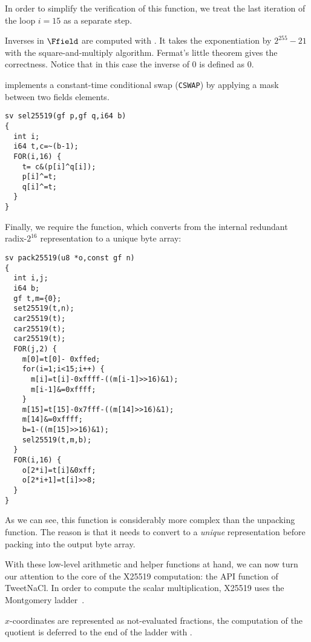In order to simplify the verification of this function,
we treat the last iteration of the loop $i = 15$ as a separate step.

Inverses in $\Ffield$ are computed with .
It takes the exponentiation by $2^{255}-21$ with the square-and-multiply algorithm.
Fermat's little theorem gives the correctness.
Notice that in this case the inverse of $0$ is defined as $0$.

 implements a constant-time conditional swap (\texttt{CSWAP}) by
applying a mask between two fields elements.
\begin{lstlisting}[language=Ctweetnacl]
sv sel25519(gf p,gf q,i64 b)
{
  int i;
  i64 t,c=~(b-1);
  FOR(i,16) {
    t= c&(p[i]^q[i]);
    p[i]^=t;
    q[i]^=t;
  }
}
\end{lstlisting}

Finally, we require the  function,
which converts from the internal redundant radix-$2^{16}$
representation to a unique byte array:
\begin{lstlisting}[language=Ctweetnacl]
sv pack25519(u8 *o,const gf n)
{
  int i,j;
  i64 b;
  gf t,m={0};
  set25519(t,n);
  car25519(t);
  car25519(t);
  car25519(t);
  FOR(j,2) {
    m[0]=t[0]- 0xffed;
    for(i=1;i<15;i++) {
      m[i]=t[i]-0xffff-((m[i-1]>>16)&1);
      m[i-1]&=0xffff;
    }
    m[15]=t[15]-0x7fff-((m[14]>>16)&1);
    m[14]&=0xffff;
    b=1-((m[15]>>16)&1);
    sel25519(t,m,b);
  }
  FOR(i,16) {
    o[2*i]=t[i]&0xff;
    o[2*i+1]=t[i]>>8;
  }
}
\end{lstlisting}
As we can see, this function is considerably more complex than the
unpacking function. The reason is that it needs to convert
to a \emph{unique} representation before packing into the output
byte array.

With these low-level arithmetic and helper functions at hand, we can now
turn our attention to the core of the X25519 computation:
the  API function of TweetNaCl.
In order to compute the scalar multiplication,
X25519 uses the Montgomery ladder~\cite{Mon85}.

$x$-coordinates are represented as not-evaluated fractions, the computation of
the quotient is deferred to the end of the ladder with .

